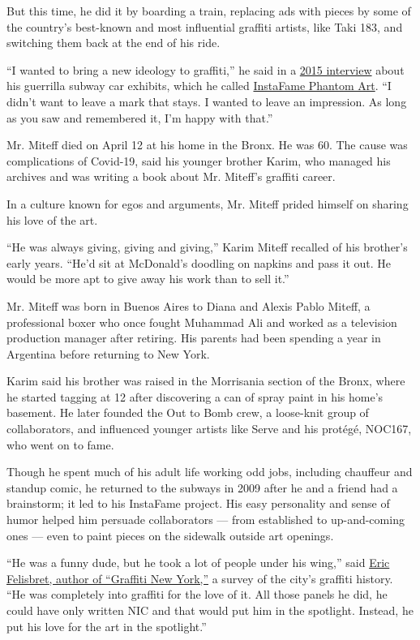 But this time, he did it by boarding a train, replacing ads with pieces
by some of the country's best-known and most influential graffiti
artists, like Taki 183, and switching them back at the end of his ride.

``I wanted to bring a new ideology to graffiti,'' he said in a
\href{https://www.nytimes.com/2015/03/02/nyregion/a-graffiti-artist-turns-a-subway-car-into-a-gallery-until-the-end-of-the-line.html}{2015
interview} about his guerrilla subway car exhibits, which he called
\href{http://www.nic707.com/}{InstaFame Phantom Art}. ``I didn't want to
leave a mark that stays. I wanted to leave an impression. As long as you
saw and remembered it, I'm happy with that.''

Mr. Miteff died on April 12 at his home in the Bronx. He was 60. The
cause was complications of Covid-19, said his younger brother Karim, who
managed his archives and was writing a book about Mr. Miteff's graffiti
career.

In a culture known for egos and arguments, Mr. Miteff prided himself on
sharing his love of the art.

``He was always giving, giving and giving,'' Karim Miteff recalled of
his brother's early years. ``He'd sit at McDonald's doodling on napkins
and pass it out. He would be more apt to give away his work than to sell
it.''

Mr. Miteff was born in Buenos Aires to Diana and Alexis Pablo Miteff, a
professional boxer who once fought Muhammad Ali and worked as a
television production manager after retiring. His parents had been
spending a year in Argentina before returning to New York.

Karim said his brother was raised in the Morrisania section of the
Bronx, where he started tagging at 12 after discovering a can of spray
paint in his home's basement. He later founded the Out to Bomb crew, a
loose-knit group of collaborators, and influenced younger artists like
Serve and his protégé, NOC167, who went on to fame.

Though he spent much of his adult life working odd jobs, including
chauffeur and standup comic, he returned to the subways in 2009 after he
and a friend had a brainstorm; it led to his InstaFame project. His easy
personality and sense of humor helped him persuade collaborators ---
from established to up-and-coming ones --- even to paint pieces on the
sidewalk outside art openings.

``He was a funny dude, but he took a lot of people under his wing,''
said
\href{https://www.nytimes.com/2010/02/05/nyregion/05graffiti.html}{Eric
Felisbret, author of ``Graffiti New York,''} a survey of the city's
graffiti history. ``He was completely into graffiti for the love of it.
All those panels he did, he could have only written NIC and that would
put him in the spotlight. Instead, he put his love for the art in the
spotlight.''

